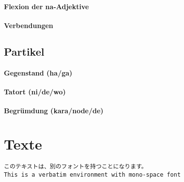 \documentclass[justified, a4paper, notitlepage, captions=tableheading, nobib]{tufte-handout}
\begin{document}
\paragraph{Flexion der na-Adjektive}
\label{sec:orgf2fdcc4}

\paragraph{Verbendungen}
\label{sec:org0c20a19}

\subsection{Partikel }
\label{sec:org66b3cbc}

\paragraph{Gegenstand (ha/ga)}
\label{sec:orgf194b23}

\paragraph{Tatort (ni/de/wo)}
\label{sec:orgf2326a7}

\paragraph{Begrümdung (kara/node/de)}
\label{sec:org5044b25}

\newpage
\section{Texte}
\label{sec:org5a965f1}

\begin{center}
\end{center}

\begin{verbatim}
このテキストは、別のフォントを持つことになります。
This is a verbatim environment with mono-space font
\end{verbatim}
\end{document}
